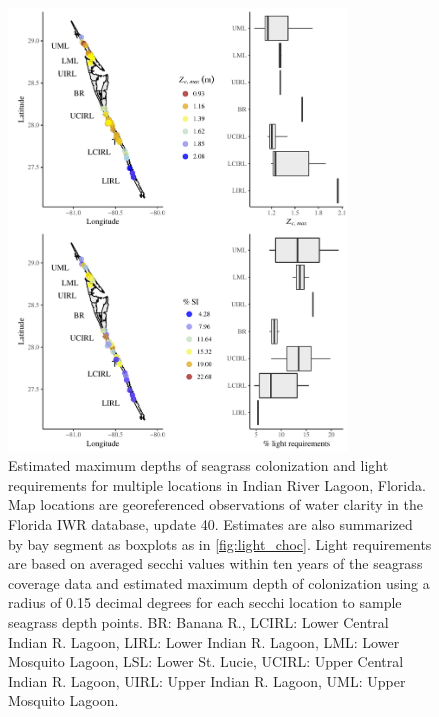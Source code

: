 \documentclass[letterpaper,12pt,oneside]{article}\usepackage[]{graphicx}\usepackage[]{color}
\begin{document}
\begin{figure}
\centering
\includegraphics[width = 0.8\textwidth]{figs/FigS3.pdf}
\caption{Estimated maximum depths of seagrass colonization and light requirements for multiple locations in Indian River Lagoon, Florida.  Map locations are georeferenced observations of water clarity in the Florida \acl{IWR} database, update 40.  Estimates are also summarized by bay segment as boxplots as in \cref{fig:light_choc}. Light requirements are based on averaged secchi values within ten years of the seagrass coverage data and estimated maximum depth of colonization using a radius of 0.15 decimal degrees for each secchi location to sample seagrass depth points. BR: Banana R., LCIRL: Lower Central Indian R. Lagoon, LIRL: Lower Indian R. Lagoon, LML: Lower Mosquito Lagoon, LSL: Lower St. Lucie, UCIRL: Upper Central Indian R. Lagoon, UIRL: Upper Indian R. Lagoon, UML: Upper Mosquito Lagoon.}
\label{fig:light_irl_zcmax}
\end{figure}
\end{document}
